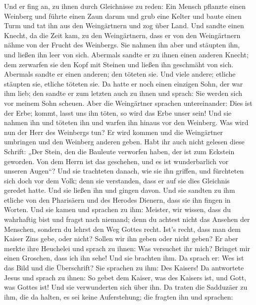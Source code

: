  Und er fing an, zu ihnen durch Gleichnisse zu reden: Ein
Mensch pflanzte einen Weinberg und führte einen Zaun darum und grub eine
Kelter und baute einen Turm und tat ihn aus den Weingärtnern und zog
über Land.  Und sandte einen Knecht, da die Zeit kam, zu
den Weingärtnern, dass er von den Weingärtnern nähme von der Frucht des
Weinbergs.  Sie nahmen ihn aber und stäupten ihn, und
ließen ihn leer von sich.  Abermals sandte er zu ihnen
einen anderen Knecht; dem zerwarfen sie den Kopf mit Steinen und ließen
ihn geschmäht von sich.  Abermals sandte er einen anderen;
den töteten sie. Und viele andere; etliche stäupten sie, etliche töteten
sie.  Da hatte er noch einen einzigen Sohn, der war ihm
lieb; den sandte er zum letzten auch zu ihnen und sprach: Sie werden
sich vor meinem Sohn scheuen.  Aber die Weingärtner
sprachen untereinander: Dies ist der Erbe; kommt, lasst uns ihn töten,
so wird das Erbe unser sein!  Und sie nahmen ihn und
töteten ihn und warfen ihn hinaus vor den Weinberg.  Was
wird nun der Herr des Weinbergs tun? Er wird kommen und die Weingärtner
umbringen und den Weinberg anderen geben.  Habt ihr auch
nicht gelesen diese Schrift: „Der Stein, den die Bauleute verworfen
haben, der ist zum Eckstein geworden.  Von dem Herrn ist
das geschehen, und es ist wunderbarlich vor unseren Augen``?
 Und sie trachteten danach, wie sie ihn griffen, und
fürchteten sich doch vor dem Volk; denn sie verstanden, dass er auf sie
dies Gleichnis geredet hatte. Und sie ließen ihn und gingen davon.
 Und sie sandten zu ihm etliche von den Pharisäern und
des Herodes Dienern, dass sie ihn fingen in Worten.  Und
sie kamen und sprachen zu ihm: Meister, wir wissen, dass du wahrhaftig
bist und fragst nach niemand; denn du achtest nicht das Ansehen der
Menschen, sondern du lehrst den Weg Gottes recht. Ist's recht, dass man
dem Kaiser Zins gebe, oder nicht? Sollen wir ihn geben oder nicht geben?
 Er aber merkte ihre Heuchelei und sprach zu ihnen: Was
versuchet ihr mich? Bringet mir einen Groschen, dass ich ihn sehe!
 Und sie brachten ihm. Da sprach er: Wes ist das Bild und
die Überschrift? Sie sprachen zu ihm: Des Kaisers!  Da
antwortete Jesus und sprach zu ihnen: So gebet dem Kaiser, was des
Kaisers ist, und Gott, was Gottes ist! Und sie verwunderten sich über
ihn.  Da traten die Sadduzäer zu ihm, die da halten, es
sei keine Auferstehung; die fragten ihn und sprachen: 
